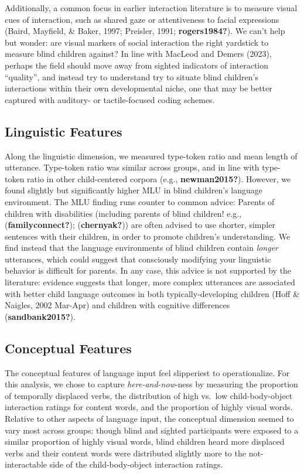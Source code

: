 \documentclass[
  man,floatsintext]{apa6}
\begin{document}
Additionally, a common focus in earlier interaction literature is to measure visual cues of interaction, such as shared gaze or attentiveness to facial expressions (Baird, Mayfield, \& Baker, 1997; Preisler, 1991; \textbf{rogers1984?}). We can't help but wonder: are visual markers of social interaction the right yardstick to measure blind children against? In line with MacLeod and Demers (2023), perhaps the field should move away from sighted indicators of interaction ``quality'', and instead try to understand try to situate blind children's interactions within their own developmental niche, one that may be better captured with auditory- or tactile-focused coding schemes.

\hypertarget{linguistic-features-1}{%
\subsection{Linguistic Features}\label{linguistic-features-1}}

Along the linguistic dimension, we measured type-token ratio and mean length of utterance. Type-token ratio was similar across groups, and in line with type-token ratio in other child-centered corpora (e.g., \textbf{newman2015?}). However, we found slightly but significantly higher MLU in blind children's language environment. The MLU finding runs counter to common advice: Parents of children with disabilities (including parents of blind children! e.g., (\textbf{familyconnect?}); (\textbf{chernyak?})) are often advised to use shorter, simpler sentences with their children, in order to promote children's understanding. We find instead that the language environments of blind children contain \emph{longer} utterances, which could suggest that consciously modifying your linguistic behavior is difficult for parents. In any case, this advice is not supported by the literature: evidence suggests that longer, more complex utterances are associated with better child language outcomes in both typically-developing children (Hoff \& Naigles, 2002 Mar-Apr) and children with cognitive differences (\textbf{sandbank2015?}).

\hypertarget{conceptual-features-1}{%
\subsection{Conceptual Features}\label{conceptual-features-1}}

The conceptual features of language input feel slipperiest to operationalize. For this analysis, we chose to capture \emph{here-and-now}-ness by measuring the proportion of temporally displaced verbs, the distribution of high vs.~low child-body-object interaction ratings for content words, and the proportion of highly visual words. Relative to other aspects of language input, the conceptual dimension seemed to vary most across groups: though blind and sighted participants were exposed to a similar proportion of highly visual words, blind children heard more displaced verbs and their content words were distributed slightly more to the not-interactable side of the child-body-object interaction ratings.
\end{document}
